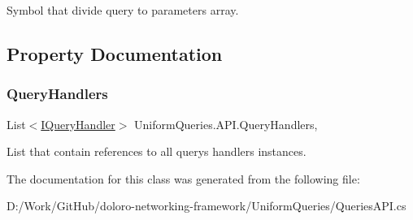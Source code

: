 Symbol that divide query to parameters array. 



\subsection{Property Documentation}
\mbox{\label{class_uniform_queries_1_1_a_p_i_a759098e511956b9afaaaf3ab13af336e}} 
\subsubsection{\texorpdfstring{Query\+Handlers}{QueryHandlers}}
{\footnotesize\ttfamily List$<$\mbox{\hyperlink{interface_uniform_queries_1_1_i_query_handler}{I\+Query\+Handler}}$>$ Uniform\+Queries.\+A\+P\+I.\+Query\+Handlers\hspace{0.3cm}{\ttfamily [static]}, {\ttfamily [get]}}



List that contain references to all query\textquotesingle{}s handlers instances. 



The documentation for this class was generated from the following file\+:\begin{DoxyCompactItemize}
\item 
D\+:/\+Work/\+Git\+Hub/doloro-\/networking-\/framework/\+Uniform\+Queries/Queries\+A\+P\+I.\+cs\end{DoxyCompactItemize}
